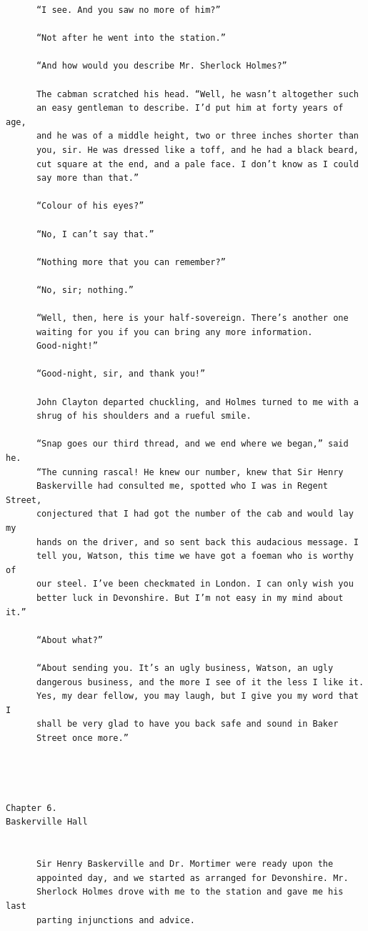 \documentclass{article}
\begin{document}
\begin{verbatim}
      “I see. And you saw no more of him?”

      “Not after he went into the station.”

      “And how would you describe Mr. Sherlock Holmes?”

      The cabman scratched his head. “Well, he wasn’t altogether such
      an easy gentleman to describe. I’d put him at forty years of age,
      and he was of a middle height, two or three inches shorter than
      you, sir. He was dressed like a toff, and he had a black beard,
      cut square at the end, and a pale face. I don’t know as I could
      say more than that.”

      “Colour of his eyes?”

      “No, I can’t say that.”

      “Nothing more that you can remember?”

      “No, sir; nothing.”

      “Well, then, here is your half-sovereign. There’s another one
      waiting for you if you can bring any more information.
      Good-night!”

      “Good-night, sir, and thank you!”

      John Clayton departed chuckling, and Holmes turned to me with a
      shrug of his shoulders and a rueful smile.

      “Snap goes our third thread, and we end where we began,” said he.
      “The cunning rascal! He knew our number, knew that Sir Henry
      Baskerville had consulted me, spotted who I was in Regent Street,
      conjectured that I had got the number of the cab and would lay my
      hands on the driver, and so sent back this audacious message. I
      tell you, Watson, this time we have got a foeman who is worthy of
      our steel. I’ve been checkmated in London. I can only wish you
      better luck in Devonshire. But I’m not easy in my mind about it.”

      “About what?”

      “About sending you. It’s an ugly business, Watson, an ugly
      dangerous business, and the more I see of it the less I like it.
      Yes, my dear fellow, you may laugh, but I give you my word that I
      shall be very glad to have you back safe and sound in Baker
      Street once more.”




Chapter 6.
Baskerville Hall


      Sir Henry Baskerville and Dr. Mortimer were ready upon the
      appointed day, and we started as arranged for Devonshire. Mr.
      Sherlock Holmes drove with me to the station and gave me his last
      parting injunctions and advice.


\end{verbatim}
\end{document}
